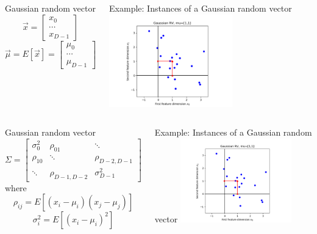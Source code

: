 \documentclass{beamer}
\begin{document}
\begin{frame}
  \begin{columns}
    \column{2.125in}
    \begin{block}{Gaussian random vector}
      \[
      \vec{x}=\left[\begin{array}{c}x_0\\\cdots\\x_{D-1}\end{array}\right]
      \]
      \[
      \vec\mu=E[\vec{x}]=\left[\begin{array}{c}\mu_0\\\cdots\\\mu_{D-1}\end{array}\right]
      \]
    \end{block}
    \column{2.125in}
    \begin{block}{Example: Instances of a Gaussian random vector}
      \includegraphics[width=2.1in]{gaussian_vectors.png}
    \end{block}
  \end{columns}
\end{frame}

\begin{frame}
  \begin{columns}
    \column{2.25in}
    \begin{block}{Gaussian random vector}
      \[
      \Sigma= \left[\begin{array}{ccc}
          \sigma_0^2 & \rho_{01} & \ddots\\
          \rho_{10} & \ddots &  \rho_{D-2,D-1}\\
          \ddots & \rho_{D-1,D-2} &  \sigma_{D-1}^2\end{array}\right]
      \]
      where
      \[
      \rho_{ij}=E[(x_i-\mu_i)(x_j-\mu_j)]
      \]
      \[
      \sigma_{i}^2=E[(x_i-\mu_i)^2]
      \]
    \end{block}
    \column{2in}
    \begin{block}{Example: Instances of a Gaussian random vector}
      \includegraphics[width=1.9in]{gaussian_vectors.png}
    \end{block}
  \end{columns}
\end{frame}
\end{document}
